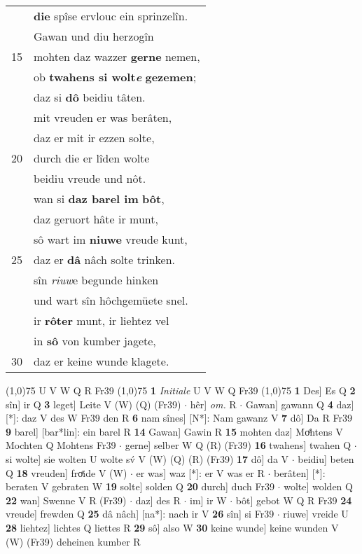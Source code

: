 \documentclass[8pt,a4paper,notitlepage]{article}
\begin{document}
\begin{table}[ht]
\begin{minipage}[t]{0.5\linewidth}
\begin{tabular}{rl}
 & \textbf{die} spîse ervlouc ein sprinzelîn.\\ 
 & Gawan und diu herzogîn\\ 
15 & mohten daz wazzer \textbf{gerne} nemen,\\ 
 & ob \textbf{twahens si wolt\textit{e}} \textbf{gezemen};\\ 
 & daz si \textbf{dô} beidiu tâten.\\ 
 & mit vreuden er was berâten,\\ 
 & daz er mit ir ezzen solte,\\ 
20 & durch die er lîden wolte\\ 
 & beidiu vreude und nôt.\\ 
 & wan si \textbf{daz barel im} \textbf{bôt},\\ 
 & daz geruort hâte ir munt,\\ 
 & sô wart im \textbf{niuwe} vreude kunt,\\ 
25 & daz er \textbf{dâ} nâch solte trinken.\\ 
 & sîn \textit{riuw}e begunde hinken\\ 
 & und wart sîn hôchgemüete snel.\\ 
 & ir \textbf{rôter} munt, ir liehtez vel\\ 
 & in \textbf{sô} von kumber jagete,\\ 
30 & daz er keine wunde klagete.\\ 
\end{tabular}
\scriptsize
\line(1,0){75} \newline
U V W Q R Fr39 \newline
\line(1,0){75} \newline
\textbf{1} \textit{Initiale} U V W Q Fr39  \newline
\line(1,0){75} \newline
\textbf{1} Des] Es Q \textbf{2} sîn] ir Q \textbf{3} leget] Leite V (W) (Q) (Fr39)  $\cdot$ hêr] \textit{om.} R  $\cdot$ Gawan] gawann Q \textbf{4} daz] [*]: daz V des W Fr39 den R \textbf{6} nam sînes] [N*]: Nam gawanz V \textbf{7} dô] Da R Fr39 \textbf{9} barel] [bar*lin]: ein barel R \textbf{14} Gawan] Gawin R \textbf{15} mohten daz] Moͤhtens V Mochten Q Mohtens Fr39  $\cdot$ gerne] selber W Q (R) (Fr39) \textbf{16} twahens] twahen Q  $\cdot$ si wolte] sie wolten U wolte sv́ V (W) (Q) (R) (Fr39) \textbf{17} dô] da V  $\cdot$ beidiu] beten Q \textbf{18} vreuden] froͤide V (W)  $\cdot$ er was] waz [*]: er V was er R  $\cdot$ berâten] [*]: beraten V gebraten W \textbf{19} solte] solden Q \textbf{20} durch] duch Fr39  $\cdot$ wolte] wolden Q \textbf{22} wan] Swenne V R (Fr39)  $\cdot$ daz] des R  $\cdot$ im] ir W  $\cdot$ bôt] gebot W Q R Fr39 \textbf{24} vreude] frewden Q \textbf{25} dâ nâch] [na*]: nach ir V \textbf{26} sîn] si Fr39  $\cdot$ riuwe] vreide U \textbf{28} liehtez] lichtes Q liettes R \textbf{29} sô] also W \textbf{30} keine wunde] keine wunden V (W) (Fr39) deheinen kumber R \newline
\end{minipage}
\end{table}
\end{document}
